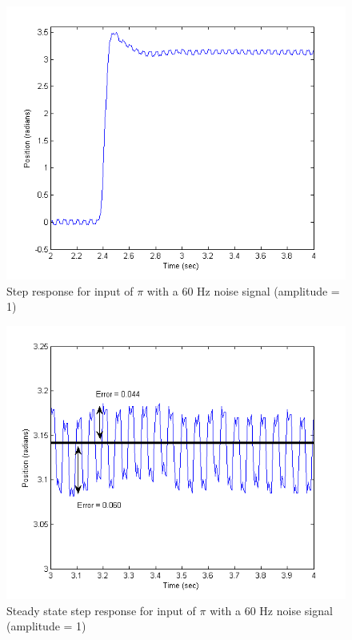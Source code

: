 \documentclass{article}
\theoremstyle{plain}
\theoremstyle{definition}
\theoremstyle{remark}
\begin{document}
\begin{figure}[htb]
\begin{center}
\includegraphics[width = 12cm]{PosNoise.png}
\caption{Step response for input of $\pi$ with a 60 Hz noise signal (amplitude = 1)}
\label{PosNoise}
\end{center}
\end{figure}

\begin{figure}[htb]
\begin{center}
\includegraphics[width = 12cm]{PosNoiseZoom.png}
\caption{Steady state step response for input of $\pi$ with a 60 Hz noise signal (amplitude = 1)}
\label{PosNoiseZoom}
\end{center}
\end{figure}
\end{document}
